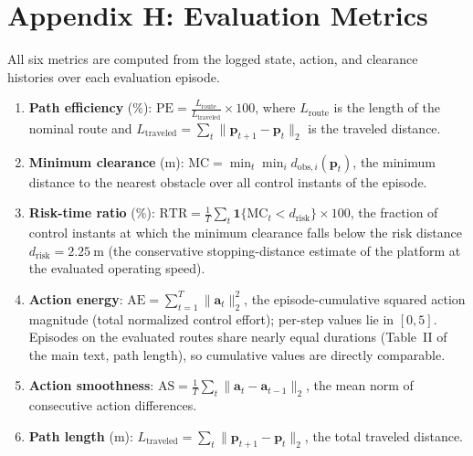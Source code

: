 \documentclass[11pt]{article}
\begin{document}
\section*{Appendix H: Evaluation Metrics}
\noindent All six metrics are computed from the logged state, action, and clearance histories over each evaluation episode.
\begin{enumerate}
\item \textbf{Path efficiency} (\%):
$\mathrm{PE}=\frac{L_{\mathrm{route}}}{L_{\mathrm{traveled}}}\times 100$,
where $L_{\mathrm{route}}$ is the length of the nominal route and
$L_{\mathrm{traveled}}=\sum_t\|\mathbf p_{t+1}-\mathbf p_t\|_2$ is the traveled distance.
\item \textbf{Minimum clearance} (m):
$\mathrm{MC}=\min_t\min_i d_{\mathrm{obs},i}(\mathbf p_t)$, the minimum distance to the nearest obstacle over all control instants of the episode.
\item \textbf{Risk-time ratio} (\%):
$\mathrm{RTR}=\frac{1}{T}\sum_t \mathbf 1\{\mathrm{MC}_t < d_{\mathrm{risk}}\}\times 100$,
the fraction of control instants at which the minimum clearance falls below the risk distance $d_{\mathrm{risk}}=2.25~\mathrm{m}$ (the conservative stopping-distance estimate of the platform at the evaluated operating speed).
\item \textbf{Action energy}:
$\mathrm{AE}=\sum_{t=1}^{T} \|\mathbf a_t\|_2^2$, the episode-cumulative squared action magnitude (total normalized control effort); per-step values lie in $[0,5]$. Episodes on the evaluated routes share nearly equal durations (Table~II of the main text, path length), so cumulative values are directly comparable.
\item \textbf{Action smoothness}:
$\mathrm{AS}=\frac{1}{T}\sum_t \|\mathbf a_t-\mathbf a_{t-1}\|_2$, the mean norm of consecutive action differences.
\item \textbf{Path length} (m):
$L_{\mathrm{traveled}}=\sum_t\|\mathbf p_{t+1}-\mathbf p_t\|_2$, the total traveled distance.
\end{enumerate}
\end{document}
